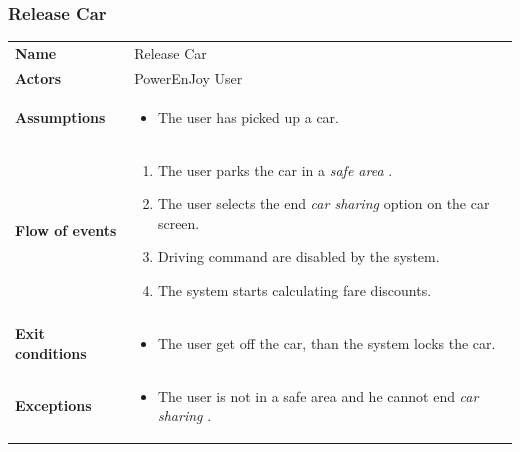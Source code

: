 \documentclass[english]{article}
\newcommand{\carsharing}{\textit {car sharing }}
\newcommand{\safearea}{\textit{safe area }}
\begin{document}
	\subsubsection{Release Car}
	\begin{center}
	\begin{tabular}{l||p{10cm}}
	\textbf{Name} 
		& Release Car\\ [8px]
	\textbf{Actors} 
		& PowerEnJoy User\\ [8px]
	\textbf{Assumptions} 
	& \begin{itemize}
		\item The user has picked up a car. 
	\end{itemize}\\
	\textbf{Flow of events}
		& \begin{enumerate}
 		\item The user parks the car in a \safearea.
		\item The user selects the end \carsharing option on the car screen.
		\item Driving command are disabled by the system. 
		\item The system starts calculating fare discounts.
		\end{enumerate}\\ 
	\textbf{Exit conditions}
		&\begin{itemize}
			\item The user get off the car, than the system locks the car.
		\end{itemize}\\
	\textbf{Exceptions}
		& \begin{itemize}
			\item The user is not in a safe area and he cannot end \carsharing. 
		\end{itemize}
	\end{tabular}
	\end{center}
\end{document}
